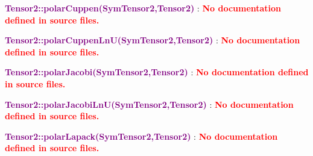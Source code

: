 
\textcolor{purple}{\textbf{Tensor2::polarCuppen(SymTensor2,Tensor2)}}\label{Tensor2::polarCuppen(SymTensor2,Tensor2)} : \textcolor{red}{\textbf{No documentation defined in source files.}}


\textcolor{purple}{\textbf{Tensor2::polarCuppenLnU(SymTensor2,Tensor2)}}\label{Tensor2::polarCuppenLnU(SymTensor2,Tensor2)} : \textcolor{red}{\textbf{No documentation defined in source files.}}


\textcolor{purple}{\textbf{Tensor2::polarJacobi(SymTensor2,Tensor2)}}\label{Tensor2::polarJacobi(SymTensor2,Tensor2)} : \textcolor{red}{\textbf{No documentation defined in source files.}}


\textcolor{purple}{\textbf{Tensor2::polarJacobiLnU(SymTensor2,Tensor2)}}\label{Tensor2::polarJacobiLnU(SymTensor2,Tensor2)} : \textcolor{red}{\textbf{No documentation defined in source files.}}


\textcolor{purple}{\textbf{Tensor2::polarLapack(SymTensor2,Tensor2)}}\label{Tensor2::polarLapack(SymTensor2,Tensor2)} : \textcolor{red}{\textbf{No documentation defined in source files.}}

